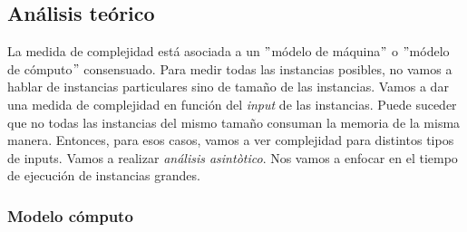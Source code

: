 \documentclass[10pt,a4paper]{article}
\begin{document}
\subsection{Análisis teórico}

La medida de complejidad está asociada a un $"$módelo de máquina$"$ o $"$módelo de cómputo$"$ consensuado.
\newline
\newline
Para medir todas las instancias posibles, no vamos a hablar de instancias particulares sino de tamaño de las instancias. Vamos a dar una medida de complejidad en función del \textit{input} de las instancias. 
\newline
\newline
Puede suceder que no todas las instancias del mismo tamaño consuman la memoria de la misma manera. Entonces, para esos casos, vamos a ver complejidad para distintos tipos de inputs. 
\newline
\newline
Vamos a realizar \textit{análisis asintòtico}. Nos vamos a enfocar en el tiempo de ejecución de instancias grandes.

\subsubsection{Modelo cómputo}
\end{document}
